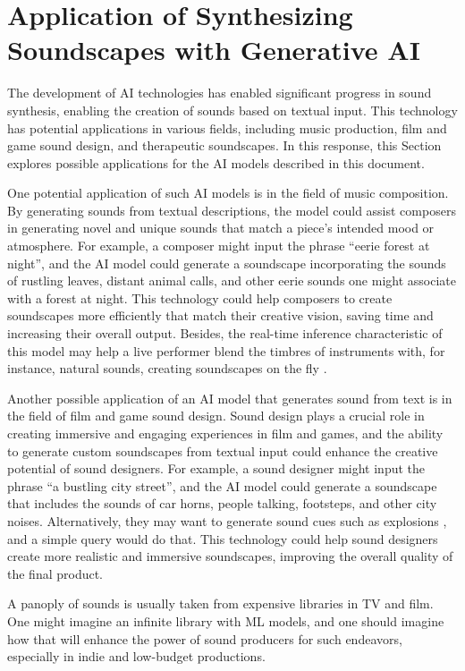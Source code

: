 \section{Application of Synthesizing Soundscapes with Generative AI} \label{sec:significance}

The development of \ac{AI} technologies has enabled significant progress in sound synthesis, enabling the creation of sounds based on textual input. This technology has potential applications in various fields, including music production, film and game sound design, and therapeutic soundscapes. In this response, this Section explores possible applications for the \ac{AI} models described in this document.

One potential application of such \ac{AI} models is in the field of music composition. By generating sounds from textual descriptions, the model could assist composers in generating novel and unique sounds that match a piece's intended mood or atmosphere. For example, a composer might input the phrase ``eerie forest at night'', and the \ac{AI} model could generate a soundscape incorporating the sounds of rustling leaves, distant animal calls, and other eerie sounds one might associate with a forest at night. This technology could help composers to create soundscapes more efficiently that match their creative vision, saving time and increasing their overall output. Besides, the real-time inference characteristic of this model may help a live performer blend the timbres of instruments with, for instance, natural sounds, creating soundscapes on the fly \cite{huzaifah_deep_2021}.

Another possible application of an \ac{AI} model that generates sound from text is in the field of film and game sound design. Sound design plays a crucial role in creating immersive and engaging experiences in film and games, and the ability to generate custom soundscapes from textual input could enhance the creative potential of sound designers. For example, a sound designer might input the phrase ``a bustling city street'', and the \ac{AI} model could generate a soundscape that includes the sounds of car horns, people talking, footsteps, and other city noises. Alternatively, they may want to generate sound cues such as explosions \cite{huzaifah_deep_2021}, and a simple query would do that. This technology could help sound designers create more realistic and immersive soundscapes, improving the overall quality of the final product. 

A panoply of sounds is usually taken from expensive libraries in TV and film. One might imagine an infinite library with \ac{ML} models, and one should imagine how that will enhance the power of sound producers for such endeavors, especially in indie and low-budget productions.